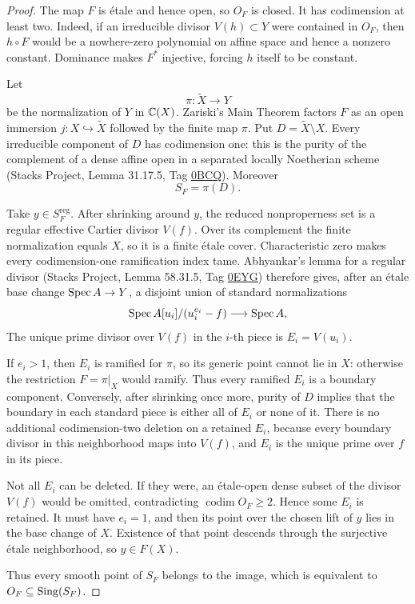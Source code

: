 \begin{proof}
The map \(F\) is étale and hence open, so \(O_F\) is closed.  It has
codimension at least two.  Indeed, if an irreducible divisor
\(V(h)\subset Y\) were contained in \(O_F\), then \(h\circ F\) would be a
nowhere-zero polynomial on affine space and hence a nonzero constant.
Dominance makes \(F^*\) injective, forcing \(h\) itself to be constant.

Let
\[
\pi\colon\widetilde X\longrightarrow Y
\]
be the normalization of \(Y\) in \(\mathbb C(X)\).  Zariski's Main Theorem factors
\(F\) as an open immersion \(j\colon X\hookrightarrow\widetilde X\) followed
by the finite map \(\pi\).  Put \(D=\widetilde X\setminus X\).  Every
irreducible component of \(D\) has codimension one: this is the purity of the
complement of a dense affine open in a separated locally Noetherian scheme
(Stacks Project, Lemma 31.17.5, Tag
\href{https://stacks.math.columbia.edu/tag/0BCQ}{0BCQ}).  Moreover
\[
S_F=\pi(D).
\]

Take \(y\in S_F^{\mathrm{reg}}\).  After shrinking around \(y\), the reduced
nonproperness set is a regular effective Cartier divisor \(V(f)\).  Over its
complement the finite normalization equals \(X\), so it is a finite
étale cover.  Characteristic zero makes every codimension-one
ramification index tame.  Abhyankar's lemma for a regular divisor (Stacks
Project, Lemma 58.31.5, Tag
\href{https://stacks.math.columbia.edu/tag/0EYG}{0EYG}) therefore gives, after
an étale base change \(\operatorname{Spec} A\to Y\), a disjoint union of standard
normalizations
\[
\operatorname{Spec} A[u_i]/(u_i^{e_i}-f)\longrightarrow\operatorname{Spec} A,
\]
The unique prime divisor over \(V(f)\) in the \(i\)-th piece is
\(E_i=V(u_i)\).

If \(e_i>1\), then \(E_i\) is ramified for \(\pi\), so its generic point
cannot lie in \(X\): otherwise the restriction \(F=\pi|_X\) would ramify.
Thus every ramified \(E_i\) is a boundary component.  Conversely, after
shrinking once more, purity of \(D\) implies that the boundary in each
standard piece is either all of \(E_i\) or none of it.  There is no additional
codimension-two deletion on a retained \(E_i\), because every boundary
divisor in this neighborhood maps into \(V(f)\), and \(E_i\) is the unique
prime over \(f\) in its piece.

Not all \(E_i\) can be deleted.  If they were, an étale-open dense
subset of the divisor \(V(f)\) would be omitted, contradicting
\(\operatorname{codim}O_F\ge2\).  Hence some \(E_i\) is retained.  It must
have \(e_i=1\), and then its point over the chosen lift of \(y\) lies in the
base change of \(X\).  Existence of that point descends through the
surjective étale neighborhood, so \(y\in F(X)\).

Thus every smooth point of \(S_F\) belongs to the image, which is equivalent
to \(O_F\subseteq\operatorname{Sing}(S_F)\).
\end{proof}

